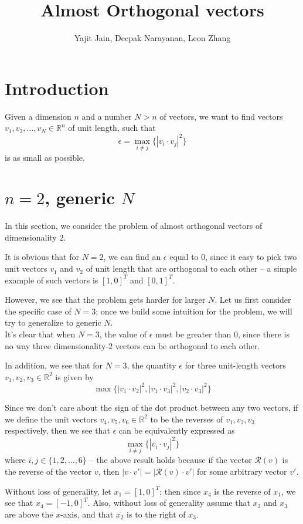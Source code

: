 \documentclass[11pt,letterpaper,twoside,english]{article}
\title{Almost Orthogonal vectors}
\author{Yajit Jain, Deepak Narayanan, Leon Zhang}
\theoremstyle{theorem}
\theoremstyle{remark}
\begin{document}
\maketitle

\section{Introduction}
Given a dimension $n$ and a number $N > n$ of vectors, we want to find vectors $v_1, v_2, \ldots, v_N \in \mathbb{R}^n$ of unit length, such that
$$\epsilon = \max_{i \neq j} \{ |v_i \cdot v_j|^2 \}$$
is as small as possible.

\section{$n=2$, generic $N$}
In this section, we consider the problem of almost orthogonal vectors of dimensionality $2$.

It is obvious that for $N=2$, we can find an $\epsilon$ equal to $0$, since it easy to pick two unit vectors $v_1$ and $v_2$ of unit length that are orthogonal to each other -- a simple example of such vectors is $[1, 0]^T$ and $[0, 1]^T$. 

However, we see that the problem gets harder for larger $N$. Let us first consider the specific case of $N=3$; once we build some intuition for the problem, we will try to generalize to generic $N$.
\\

It's clear that when $N=3$, the value of $\epsilon$ must be greater than $0$, since there is no way three dimensionality-$2$ vectors can be orthogonal to each other.

In addition, we see that for $N=3$, the quantity $\epsilon$ for three unit-length vectors $v_1, v_2, v_3 \in \mathbb{R}^2$ is given by $$\max \{ |v_1 \cdot v_2|^2, |v_1 \cdot v_3|^2, |v_2 \cdot v_3|^2 \}$$

Since we don't care about the sign of the dot product between any two vectors, if we define the unit vectors $v_4, v_5, v_6 \in \mathbb{R}^2$ to be the reverses of $v_1, v_2, v_3$ respectively, then we see that $\epsilon$ can be equivalently expressed as $$\max_{i \neq j} \{|v_i \cdot v_j |^2 \}$$
where $i, j \in \{1,2,\ldots,6\}$ -- the above result holds because if the vector $\mathcal{R}(v)$ is the reverse of the vector $v$, then $|v \cdot v'| = |\mathcal{R}(v) \cdot v'|$ for some arbitrary vector $v'$.

Without loss of generality, let $x_1 = [1, 0]^T$; then since $x_4$ is the reverse of $x_1$, we see that $x_4 = [-1, 0]^T$. Also, without loss of generality assume that $x_2$ and $x_3$ are above the $x$-axis, and that $x_2$ is to the right of $x_3$.
\end{document}
